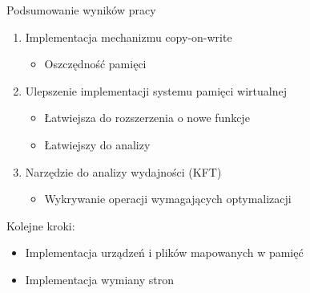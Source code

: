 \documentclass[notes]{beamer}
\begin{document}
\begin{frame}{Podsumowanie wyników pracy}
  \begin{enumerate}
    \item<1-> Implementacja mechanizmu copy-on-write
      \begin{itemize}
        \item Oszczędność pamięci
      \end{itemize}
      \vspace{1em}
    \item<2-> Ulepszenie implementacji systemu pamięci wirtualnej
      \begin{itemize}
        \item Łatwiejsza do rozszerzenia o nowe funkcje
        \item Łatwiejszy do analizy
      \end{itemize}
      \vspace{1em}
    \item<3-> Narzędzie do analizy wydajności (KFT)
      \begin{itemize}
        \item Wykrywanie operacji wymagających optymalizacji
      \end{itemize}
  \end{enumerate}
  \vfill
  Kolejne kroki:
  \begin{itemize}
    \item Implementacja urządzeń i plików mapowanych w pamięć
    \item Implementacja wymiany stron
  \end{itemize}
\end{frame}
\end{document}
